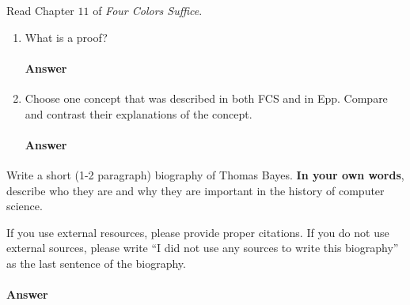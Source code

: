 \documentclass{article}
\begin{document}
Read Chapter $11$ of \emph{Four Colors Suffice}.

\begin{enumerate}

    \item What is a proof?

        \paragraph{Answer}



    \item Choose one concept that was described in both FCS and in Epp.
        Compare and contrast their explanations of the concept.

        \paragraph{Answer}


\end{enumerate}

\collab{\todo{}}

Write a short (1-2 paragraph) biography of Thomas Bayes.
\textbf{In your own words}, describe who they are and why they are important in
the history of computer science.

If you use external resources, please provide
proper citations. If you do not use external sources, please write ``I did not
use any sources to write this biography'' as the last sentence of the
biography.

\paragraph{Answer}


% 
% 
\end{document}
